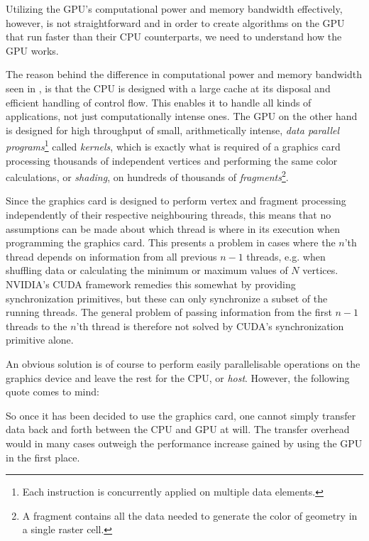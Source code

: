 Utilizing the GPU's computational power and memory bandwidth effectively,
however, is not straightforward and in order to create algorithms on the GPU
that run faster than their CPU counterparts, we need to understand how the GPU
works.

The reason behind the difference in computational power and memory bandwidth
seen in , is that the CPU is designed with a large
cache at its disposal and efficient handling of control flow. This enables it to
handle all kinds of applications, not just computationally intense ones. The GPU
on the other hand is designed for high throughput of small, arithmetically
intense, \textit{data parallel programs}\footnote{Each instruction is
  concurrently applied on multiple data elements.} called \textit{kernels},
which is exactly what is required of a graphics card processing thousands of
independent vertices and performing the same color calculations, or
\textit{shading}, on hundreds of thousands of \textit{fragments}\footnote{A
  fragment contains all the data needed to generate the color of geometry in a
  single raster cell.}.

Since the graphics card is designed to perform vertex and fragment processing
independently of their respective neighbouring threads, this means that no
assumptions can be made about which thread is where in its execution when
programming the graphics card. This presents a problem in cases where the $n$'th
thread depends on information from all previous $n-1$ threads, e.g. when
shuffling data or calculating the minimum or maximum values of $N$
vertices. NVIDIA's CUDA framework remedies this somewhat by providing
synchronization primitives, but these can only synchronize a subset of the
running threads. The general problem of passing information from the first $n-1$
threads to the $n$'th thread is therefore not solved by CUDA's synchronization
primitive alone.


An obvious solution is of course to perform easily parallelisable operations on
the graphics device and leave the rest for the CPU, or \textit{host}. However,
the following quote comes to mind:


So once it has been decided to use the graphics card, one cannot simply transfer
data back and forth between the CPU and GPU at will. The transfer overhead would
in many cases outweigh the performance increase gained by using the GPU in the
first place.

